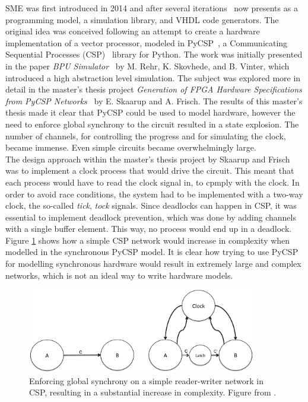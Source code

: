 SME was first introduced in 2014 and after several iterations~\cite{Vinter2014, Vinter2015, Skovhede} now presents as a programming model, a simulation library, and VHDL code generators. The original idea was conceived following an attempt to create a hardware implementation of a vector processor, modeled in PyCSP~\cite{bjorndalen2007pycsp, vinter2009pycsp},
a Communicating Sequential Processes (CSP)~\cite{Hoare1978} library for Python. The work was initially presented in the paper \textit{BPU Simulator}~\cite{Rehr2013} by M. Rehr, K. Skovhede, and B. Vinter, which introduced a high abstraction level simulation. The subject was explored more in detail in the master's thesis project \textit{Generation of FPGA Hardware
Specifications from PyCSP Networks}~\cite{Skaarup14} by E. Skaarup and A. Frisch. The results of this master's thesis made it clear that PyCSP could be used to model hardware, however the need to enforce global synchrony to the circuit resulted in a state explosion. The number of channels, for controlling the progress and for simulating the clock, became immense. Even simple circuits became overwhelmingly large.\\

The design approach within the master's thesis project by Skaarup and Frisch was to implement a clock process that would drive the circuit. This meant that each process would have to read the clock signal in, to cpmply with the clock. In order to avoid race conditions, the system had to be implemented with a two-way clock, the so-called \textit{tick}, \textit{tock} signals. Since deadlocks can happen in CSP, it was essential to implement deadlock prevention, which was done by adding channels with a single buffer element. This way, no process would end up in a deadlock. Figure \ref{fig:sme:clock_latch} shows how a simple CSP network would increase in complexity when modelled in the synchronous PyCSP model. It is clear how trying to use PyCSP for modelling synchronous hardware would result in extremely large and complex networks, which is not an ideal way to write hardware models.\\
\begin{figure}[h!]
\centering
\includegraphics[width=10.0cm]{figures/clocked.pdf}
\caption{Enforcing global synchrony on a simple reader-writer network in CSP, resulting in a substantial increase in complexity. Figure from \cite{Vinter2014}.}
\label{fig:sme:clock_latch}
\end{figure}

